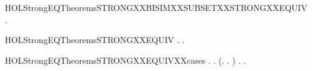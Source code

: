 \begin{SaveVerbatim}{HOLStrongEQTheoremsSTRONGXXBISIMXXSUBSETXXSTRONGXXEQUIV}
\HOLTokenTurnstile{} \HOLSymConst{\HOLTokenForall{}}.   \HOLSymConst{\HOLTokenImp{}}   
\end{SaveVerbatim}
\newcommand{\HOLStrongEQTheoremsSTRONGXXBISIMXXSUBSETXXSTRONGXXEQUIV}{\UseVerbatim{HOLStrongEQTheoremsSTRONGXXBISIMXXSUBSETXXSTRONGXXEQUIV}}
\begin{SaveVerbatim}{HOLStrongEQTheoremsSTRONGXXEQUIV}
\HOLTokenTurnstile{} \HOLSymConst{\HOLTokenForall{}} .
          \HOLSymConst{\HOLTokenEquiv{}} \HOLSymConst{\HOLTokenExists{}}.    \HOLSymConst{\HOLTokenConj{}}  
\end{SaveVerbatim}
\newcommand{\HOLStrongEQTheoremsSTRONGXXEQUIV}{\UseVerbatim{HOLStrongEQTheoremsSTRONGXXEQUIV}}
\begin{SaveVerbatim}{HOLStrongEQTheoremsSTRONGXXEQUIVXXcases}
\HOLTokenTurnstile{} \HOLSymConst{\HOLTokenForall{}} .
          \HOLSymConst{\HOLTokenEquiv{}}
       \HOLSymConst{\HOLTokenForall{}}.
           (\HOLSymConst{\HOLTokenForall{}}.  \HOLTokenTransBegin{}\HOLTokenTransEnd {} \HOLSymConst{\HOLTokenImp{}} \HOLSymConst{\HOLTokenExists{}}.  \HOLTokenTransBegin{}\HOLTokenTransEnd {} \HOLSymConst{\HOLTokenConj{}}   ) \HOLSymConst{\HOLTokenConj{}}
           \HOLSymConst{\HOLTokenForall{}}.  \HOLTokenTransBegin{}\HOLTokenTransEnd {} \HOLSymConst{\HOLTokenImp{}} \HOLSymConst{\HOLTokenExists{}}.  \HOLTokenTransBegin{}\HOLTokenTransEnd {} \HOLSymConst{\HOLTokenConj{}}   
\end{SaveVerbatim}
